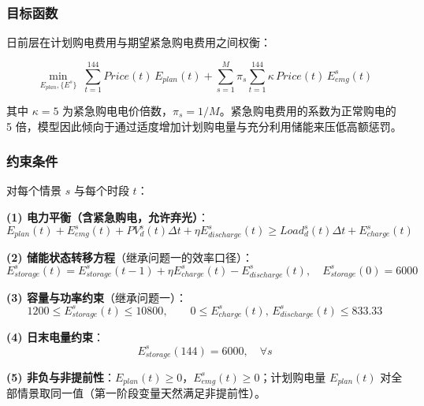 \documentclass[zihao=-4,a4paper,UTF8,fontset=none]{ctexart}
\begin{document}
\subsubsection{目标函数}

日前层在计划购电费用与期望紧急购电费用之间权衡：

\begin{equation}
  \min_{E_{plan},\{E^{s}\}}\;
  \sum_{t=1}^{144} Price(t)\,E_{plan}(t)
  + \sum_{s=1}^{M}\pi_s \sum_{t=1}^{144} \kappa\, Price(t)\, E_{emg}^{s}(t)
  \label{eq:q2_obj}
\end{equation}

其中 $\kappa=5$ 为紧急购电电价倍数，$\pi_s=1/M$。紧急购电费用的系数为正常购电的 5 倍，模型因此倾向于通过适度增加计划购电量与充分利用储能来压低高额惩罚。

\subsubsection{约束条件}

对每个情景 $s$ 与每个时段 $t$：

\textbf{(1) 电力平衡（含紧急购电，允许弃光）}：
\begin{equation}
  E_{plan}(t) + E_{emg}^{s}(t) + PV_d^{s}(t)\Delta t + \eta E_{discharge}^{s}(t)
  \ge Load_d^{s}(t)\Delta t + E_{charge}^{s}(t)
  \label{eq:q2_balance}
\end{equation}

\textbf{(2) 储能状态转移方程}（继承问题一的效率口径）：
\begin{equation}
  E_{storage}^{s}(t) = E_{storage}^{s}(t-1) + \eta E_{charge}^{s}(t) - E_{discharge}^{s}(t),\quad
  E_{storage}^{s}(0) = 6000
  \label{eq:q2_state}
\end{equation}

\textbf{(3) 容量与功率约束}（继承问题一）：
\begin{equation}
  1200 \le E_{storage}^{s}(t) \le 10800,\qquad
  0 \le E_{charge}^{s}(t),\, E_{discharge}^{s}(t) \le 833.33
  \label{eq:q2_bounds}
\end{equation}

\textbf{(4) 日末电量约束}：
\begin{equation}
  E_{storage}^{s}(144) = 6000,\quad \forall s
  \label{eq:q2_terminal}
\end{equation}

\textbf{(5) 非负与非提前性}：$E_{plan}(t)\ge 0$，$E_{emg}^{s}(t)\ge 0$；计划购电量 $E_{plan}(t)$ 对全部情景取同一值（第一阶段变量天然满足非提前性）。
\end{document}
